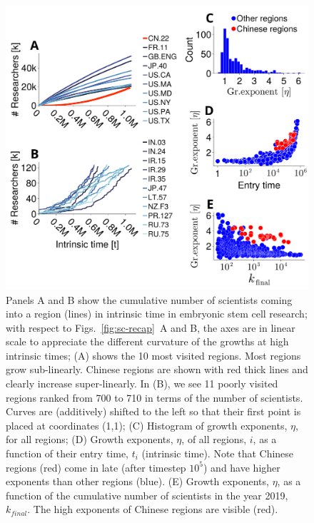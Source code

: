 \documentclass[draft,final]{vutinfth} %
\begin{document}
\begin{figure}[t]
    \centering
\includegraphics[width=0.8\linewidth]{figures_csf/fig3-cells.pdf}
    \caption{Panels A and B show the cumulative number of scientists coming into a region (lines) in intrinsic time in embryonic stem cell research; 
    with respect to Figs.~\ref{fig:sc-recap}~A and B, the axes are in linear scale to appreciate the different curvature of the growths at high intrinsic times;
    (A) shows the 10 most visited regions. Most regions grow sub-linearly. Chinese regions are shown with red thick lines and clearly increase super-linearly.
    In (B), we see 11 poorly visited regions ranked from 700 to 710 in terms of the number of scientists. Curves are (additively) shifted to the left so that their first point is placed at coordinates (1,1);
    (C) Histogram of growth exponents, $\eta$, for all regions;
    (D) Growth exponents, $\eta$, of all regions, $i$, as a function of their entry time, $t_i$ (intrinsic time). Note that Chinese regions (red) come in late (after timestep $10^5$) and have higher exponents than other regions (blue).
    (E) Growth exponents, $\eta$, as a function of the cumulative number of scientists in the year 2019, $k_{final}$. The high exponents of Chinese regions are visible (red).}
    \label{fig:cells-intrinsic_growth}
\end{figure}
\end{document}
